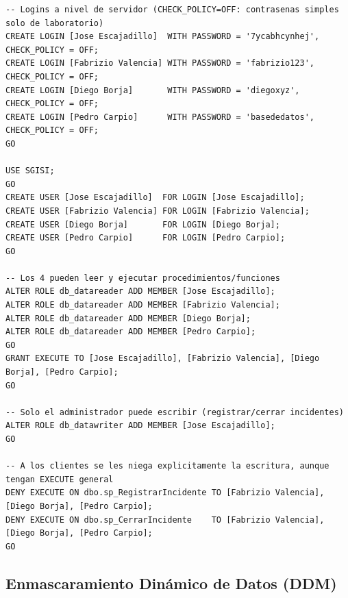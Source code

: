 \documentclass[11pt,a4paper]{article}
\begin{document}
\begin{lstlisting}
-- Logins a nivel de servidor (CHECK_POLICY=OFF: contrasenas simples solo de laboratorio)
CREATE LOGIN [Jose Escajadillo]  WITH PASSWORD = '7ycabhcynhej', CHECK_POLICY = OFF;
CREATE LOGIN [Fabrizio Valencia] WITH PASSWORD = 'fabrizio123',  CHECK_POLICY = OFF;
CREATE LOGIN [Diego Borja]       WITH PASSWORD = 'diegoxyz',     CHECK_POLICY = OFF;
CREATE LOGIN [Pedro Carpio]      WITH PASSWORD = 'basededatos',  CHECK_POLICY = OFF;
GO

USE SGISI;
GO
CREATE USER [Jose Escajadillo]  FOR LOGIN [Jose Escajadillo];
CREATE USER [Fabrizio Valencia] FOR LOGIN [Fabrizio Valencia];
CREATE USER [Diego Borja]       FOR LOGIN [Diego Borja];
CREATE USER [Pedro Carpio]      FOR LOGIN [Pedro Carpio];
GO

-- Los 4 pueden leer y ejecutar procedimientos/funciones
ALTER ROLE db_datareader ADD MEMBER [Jose Escajadillo];
ALTER ROLE db_datareader ADD MEMBER [Fabrizio Valencia];
ALTER ROLE db_datareader ADD MEMBER [Diego Borja];
ALTER ROLE db_datareader ADD MEMBER [Pedro Carpio];
GO
GRANT EXECUTE TO [Jose Escajadillo], [Fabrizio Valencia], [Diego Borja], [Pedro Carpio];
GO

-- Solo el administrador puede escribir (registrar/cerrar incidentes)
ALTER ROLE db_datawriter ADD MEMBER [Jose Escajadillo];
GO

-- A los clientes se les niega explicitamente la escritura, aunque tengan EXECUTE general
DENY EXECUTE ON dbo.sp_RegistrarIncidente TO [Fabrizio Valencia], [Diego Borja], [Pedro Carpio];
DENY EXECUTE ON dbo.sp_CerrarIncidente    TO [Fabrizio Valencia], [Diego Borja], [Pedro Carpio];
GO
\end{lstlisting}

\subsection{Enmascaramiento Dinámico de Datos (DDM)}
\end{document}
